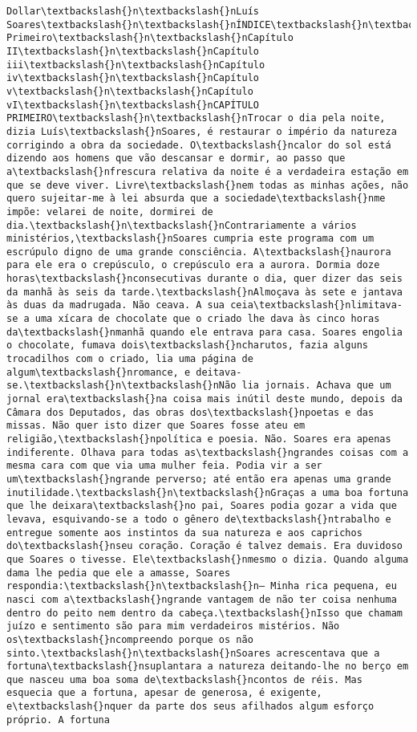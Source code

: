 \begin{Verbatim}[commandchars=\\\{\}]
Dollar\textbackslash{}n\textbackslash{}nLuís Soares\textbackslash{}n\textbackslash{}nÍNDICE\textbackslash{}n\textbackslash{}nCapítulo Primeiro\textbackslash{}n\textbackslash{}nCapítulo II\textbackslash{}n\textbackslash{}nCapítulo iii\textbackslash{}n\textbackslash{}nCapítulo iv\textbackslash{}n\textbackslash{}nCapítulo v\textbackslash{}n\textbackslash{}nCapítulo vI\textbackslash{}n\textbackslash{}nCAPÍTULO PRIMEIRO\textbackslash{}n\textbackslash{}nTrocar o dia pela noite, dizia Luís\textbackslash{}nSoares, é restaurar o império da natureza corrigindo a obra da sociedade. O\textbackslash{}ncalor do sol está dizendo aos homens que vão descansar e dormir, ao passo que a\textbackslash{}nfrescura relativa da noite é a verdadeira estação em que se deve viver. Livre\textbackslash{}nem todas as minhas ações, não quero sujeitar-me à lei absurda que a sociedade\textbackslash{}nme impõe: velarei de noite, dormirei de dia.\textbackslash{}n\textbackslash{}nContrariamente a vários ministérios,\textbackslash{}nSoares cumpria este programa com um escrúpulo digno de uma grande consciência. A\textbackslash{}naurora para ele era o crepúsculo, o crepúsculo era a aurora. Dormia doze horas\textbackslash{}nconsecutivas durante o dia, quer dizer das seis da manhã às seis da tarde.\textbackslash{}nAlmoçava às sete e jantava às duas da madrugada. Não ceava. A sua ceia\textbackslash{}nlimitava-se a uma xícara de chocolate que o criado lhe dava às cinco horas da\textbackslash{}nmanhã quando ele entrava para casa. Soares engolia o chocolate, fumava dois\textbackslash{}ncharutos, fazia alguns trocadilhos com o criado, lia uma página de algum\textbackslash{}nromance, e deitava-se.\textbackslash{}n\textbackslash{}nNão lia jornais. Achava que um jornal era\textbackslash{}na coisa mais inútil deste mundo, depois da Câmara dos Deputados, das obras dos\textbackslash{}npoetas e das missas. Não quer isto dizer que Soares fosse ateu em religião,\textbackslash{}npolítica e poesia. Não. Soares era apenas indiferente. Olhava para todas as\textbackslash{}ngrandes coisas com a mesma cara com que via uma mulher feia. Podia vir a ser um\textbackslash{}ngrande perverso; até então era apenas uma grande inutilidade.\textbackslash{}n\textbackslash{}nGraças a uma boa fortuna que lhe deixara\textbackslash{}no pai, Soares podia gozar a vida que levava, esquivando-se a todo o gênero de\textbackslash{}ntrabalho e entregue somente aos instintos da sua natureza e aos caprichos do\textbackslash{}nseu coração. Coração é talvez demais. Era duvidoso que Soares o tivesse. Ele\textbackslash{}nmesmo o dizia. Quando alguma dama lhe pedia que ele a amasse, Soares respondia:\textbackslash{}n\textbackslash{}n— Minha rica pequena, eu nasci com a\textbackslash{}ngrande vantagem de não ter coisa nenhuma dentro do peito nem dentro da cabeça.\textbackslash{}nIsso que chamam juízo e sentimento são para mim verdadeiros mistérios. Não os\textbackslash{}ncompreendo porque os não sinto.\textbackslash{}n\textbackslash{}nSoares acrescentava que a fortuna\textbackslash{}nsuplantara a natureza deitando-lhe no berço em que nasceu uma boa soma de\textbackslash{}ncontos de réis. Mas esquecia que a fortuna, apesar de generosa, é exigente, e\textbackslash{}nquer da parte dos seus afilhados algum esforço próprio. A fortuna 
\end{Verbatim}
